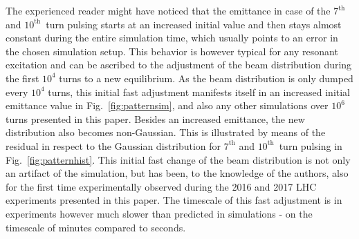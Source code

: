 \documentclass[%
 reprint,
 amsmath,amssymb,
 aps,
prstab,
]{revtex4-1}
\begin{document}
The experienced reader might have noticed that the emittance in case of the $7^{\mathrm{th}}$ and $10^{\mathrm{th}}$~turn pulsing starts at an increased initial value and then stays almost constant during the entire simulation time, which usually points to an error in the chosen simulation setup. This behavior is however typical for any resonant excitation and can be ascribed to the adjustment of the beam distribution during the first $10^4$ turns to a new equilibrium. As the beam distribution is only dumped every $10^4$ turns, this initial fast adjustment manifests itself in an increased initial emittance value in Fig.~\ref{fig:patternsim}, and also any other simulations over $10^6$ turns presented in this paper. Besides an increased emittance, the new distribution also becomes non-Gaussian. This is illustrated by means of the residual in respect to the Gaussian distribution for $7^{\mathrm{th}}$ and $10^{\mathrm{th}}$~turn pulsing in Fig.~\ref{fig:patternhist}. This initial fast change of the beam distribution is not only an artifact of the simulation, but has been, to the knowledge of the authors, also for the first time experimentally observed during the 2016 and 2017 LHC experiments presented in this paper. The timescale of this fast adjustment is in experiments however much slower than predicted in simulations - on the timescale of minutes compared to seconds. 
\end{document}
